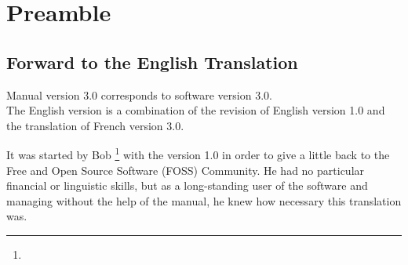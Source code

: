 \chapter{Preamble\label{preamble}}


\section*{Forward to the English Translation\label{preamble-foreword}}

Manual version 3.0 corresponds to software version 3.0.\\
The English version is a combination of the revision of English version 1.0 and the translation of French version 3.0.

It was started by Bob \footnote{\urlBobAndersonEmail{}} with the version 1.0 in order to give a little back to the \gls{Free and Open Source Software} (FOSS) Community.  He had no particular financial or linguistic skills, but as a long-standing user of the software and managing without the help of the manual, he knew how necessary this translation was.

